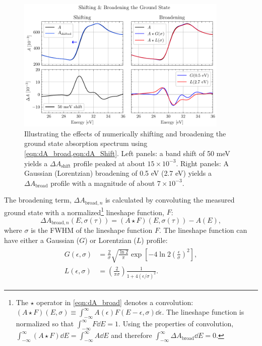 \begin{figure}
	\centering
	\includegraphics[width=0.9\textwidth]{figures/chap4/Shift_Broad_Example.pdf}
	\caption{Illustrating the effects of numerically shifting and broadening the ground state absorption spectrum using \cref{eqn:dA_broad,eqn:dA_Shift}. Left panels: a band shift of 50 meV yields a $\Delta A_{\textrm{shift}}$ profile peaked at about $15 \times 10^{-3}$. Right panels: A Gaussian (Lorentzian) broadening of 0.5 eV (2.7 eV) yields a $\Delta A_{\textrm{broad}}$ profile with a magnitude of about $7 \times 10^{-3}$.}
	\label{fig:Shift_Broad_Example}
\end{figure}

The broadening term, $\Delta A_{\textrm{broad},n}$ is calculated by convoluting the measured ground state with a normalized\footnote{The $\star$ operator in \cref{eqn:dA_broad} denotes a convolution: $(A \star F)(E, \sigma) \equiv \int_{-\infty}^{\infty} A(\epsilon) F(E-\epsilon, \sigma) \dd{\epsilon}$. The lineshape function is normalized so that $\int_{-\infty}^{\infty} F \dd{E} = 1$. Using the properties of convolution, ${\int_{-\infty}^{\infty} (A \star F) \dd{E} =  \int_{-\infty}^{\infty} A \dd{E}}$ and therefore $\int_{-\infty}^{\infty} \Delta A_{\textrm{broad}} \dd{E}=0$.} lineshape function, $F$:
\begin{equation}
\Delta A_{\textrm{broad},n}(E, \sigma(\tau)) = (A \star F) (E, \sigma(\tau)) - A(E),
\label{eqn:dA_broad}
\end{equation}
where $\sigma$ is the FWHM of the lineshape function $F$. The lineshape function can have either a Gaussian ($G$) or Lorentzian ($L$) profile:
\begin{align}
\begin{split}
G(\epsilon, \sigma) &=  \frac{2}{\sigma} \sqrt{\frac{\ln 2}{\pi}} \exp \left[ - 4 \ln 2 \left( \frac{\epsilon}{\sigma}\right)^2 \right],  \\
L(\epsilon, \sigma) &= \left(\frac{2}{\pi \sigma}\right) \frac{1}{1 + 4 \left(\epsilon/\sigma\right)^2}.
\end{split}
\end{align}

